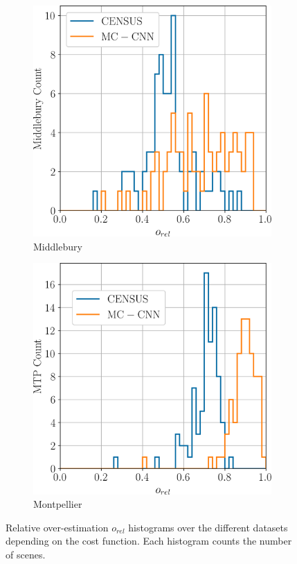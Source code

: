 \begin{figure}
    \centering
    \begin{subfigure}[t]{0.5\linewidth}
        \centering
        \includegraphics[width=\linewidth]{Images/Chap_5/histogram_o_rel_middlebury.png}
        \caption{Middlebury}
        \label{fig:o_rel_middlebury}
    \end{subfigure}\hfill
    \begin{subfigure}[t]{0.5\linewidth}
        \centering
        \includegraphics[width=\linewidth]{Images/Chap_5/histogram_o_rel_mtp.png}
        \caption{Montpellier}
        \label{fig:o_rel_mtp}
    \end{subfigure}
    \caption{Relative over-estimation $o_{rel}$ histograms over the different datasets depending on the cost function. Each histogram counts the number of scenes.}
    \label{fig:o_rel_hist}
\end{figure}

